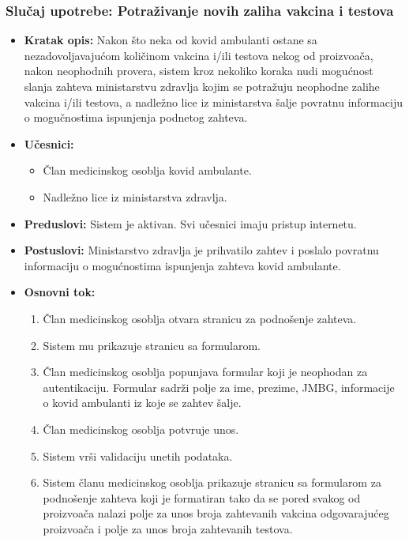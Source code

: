 \documentclass[titlepage]{article}
\begin{document}
\subsubsection{Slučaj upotrebe: Potra\v{z}ivanje novih zaliha vakcina i testova}
\begin{itemize}
\item \textbf{Kratak opis:} Nakon \v{s}to neka od kovid ambulanti ostane sa nezadovoljavaju\'{c}om koli\v{c}inom vakcina i/ili testova nekog od proizvo\dj{}a\v{c}a,  nakon neophodnih provera, sistem kroz nekoliko koraka nudi mogu\'{c}nost slanja zahteva ministarstvu zdravlja kojim se potra\v{z}uju neophodne zalihe vakcina i/ili testova, a nadle\v{z}no lice iz ministarstva \v{s}alje povratnu informaciju o mogu\v{c}nostima ispunjenja podnetog zahteva.
\item \textbf{Učesnici:}
\begin{itemize}
    \item \v{C}lan medicinskog osoblja kovid ambulante.
    \item  Nadle\v{z}no lice iz ministarstva zdravlja.
\end{itemize}
 \item \textbf{Preduslovi:} Sistem je aktivan. Svi u\v{c}esnici imaju pristup internetu.
 \item \textbf{Postuslovi:} Ministarstvo zdravlja je prihvatilo zahtev i poslalo povratnu informaciju o mogu\'{c}nostima ispunjenja zahteva kovid ambulante.
 \item \textbf{Osnovni tok:}
 \begin{enumerate}
    \item \v{C}lan medicinskog osoblja otvara stranicu za podno\v{s}enje zahteva.
    \item Sistem mu prikazuje stranicu sa formularom.
    \item \v{C}lan medicinskog osoblja popunjava formular koji je neophodan za autentikaciju. Formular sadr\v{z}i polje za ime, prezime, JMBG, informacije o kovid ambulanti iz koje se zahtev \v{s}alje.
    \item \v{C}lan medicinskog osoblja potvr\dj{}uje unos.
    \item Sistem vr\v{s}i validaciju unetih podataka.
    \item Sistem \v{c}lanu medicinskog osoblja prikazuje stranicu sa formularom za podno\v{s}enje zahteva koji je formatiran tako da se pored svakog od proizvo\dj{}a\v{c}a nalazi polje za unos broja zahtevanih vakcina  odgovaraju\'{c}eg proizvo\dj{}a\v{c}a i polje za unos broja zahtevanih testova.  

\end{enumerate}
\end{itemize}
\end{document}
